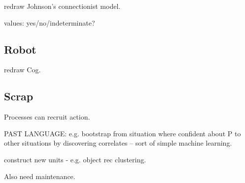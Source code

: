 redraw Johnson's connectionist model.

values: yes/no/indeterminate?

\subsection{Robot}

redraw Cog.

\subsection{Scrap}

Processes can recruit action.


PAST LANGUAGE:
  e.g. bootstrap from situation where confident about P to other situations
  by discovering correlates -- sort of simple machine learning.

  construct new units - e.g. object rec clustering.


Also need maintenance.


